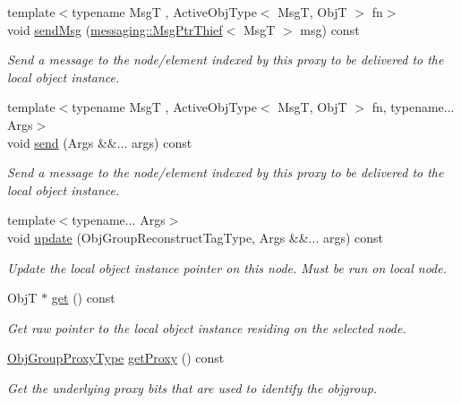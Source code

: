 \begin{DoxyCompactItemize}
{\footnotesize template$<$typename MsgT , Active\+Obj\+Type$<$ Msg\+T, Obj\+T $>$ fn$>$ }\\void \hyperlink{structvt_1_1objgroup_1_1proxy_1_1_proxy_elm_a5aca5ec4089c1c7cc2aeb3d010f247fe}{send\+Msg} (\hyperlink{structvt_1_1messaging_1_1_msg_ptr_thief}{messaging\+::\+Msg\+Ptr\+Thief}$<$ MsgT $>$ msg) const
\begin{DoxyCompactList}\small\item\em Send a message to the node/element indexed by this proxy to be delivered to the local object instance. \end{DoxyCompactList}\item 
{\footnotesize template$<$typename MsgT , Active\+Obj\+Type$<$ Msg\+T, Obj\+T $>$ fn, typename... Args$>$ }\\void \hyperlink{structvt_1_1objgroup_1_1proxy_1_1_proxy_elm_aadfbb21b80482657fd2a7eba65ad7b48}{send} (Args \&\&... args) const
\begin{DoxyCompactList}\small\item\em Send a message to the node/element indexed by this proxy to be delivered to the local object instance. \end{DoxyCompactList}\item 
{\footnotesize template$<$typename... Args$>$ }\\void \hyperlink{structvt_1_1objgroup_1_1proxy_1_1_proxy_elm_ac86c33cf46c63e61413b07509d3b9005}{update} (Obj\+Group\+Reconstruct\+Tag\+Type, Args \&\&... args) const
\begin{DoxyCompactList}\small\item\em Update the local object instance pointer on this node. Must be run on local node. \end{DoxyCompactList}\item 
ObjT $\ast$ \hyperlink{structvt_1_1objgroup_1_1proxy_1_1_proxy_elm_a4acec5b08c91f8d23a19cc6a61b19c48}{get} () const
\begin{DoxyCompactList}\small\item\em Get raw pointer to the local object instance residing on the selected node. \end{DoxyCompactList}\item 
\hyperlink{namespacevt_ad7cae989df485fccca57f0792a880a8e}{Obj\+Group\+Proxy\+Type} \hyperlink{structvt_1_1objgroup_1_1proxy_1_1_proxy_elm_ae7cbfe997421f265fa51cd29adc6957e}{get\+Proxy} () const
\begin{DoxyCompactList}\small\item\em Get the underlying proxy bits that are used to identify the objgroup. \end{DoxyCompactList}\item 

\end{DoxyCompactItemize}
